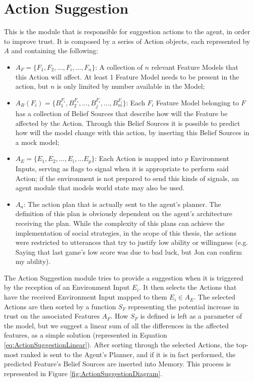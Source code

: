 \section{Action Suggestion}
\label{sec:ActionSuggestion}
This is the module that is responsible for suggestion actions to the agent, in order to improve trust. It is composed by a series of Action objects, each represented by $A$ and containing the following:
\begin{itemize}
    \item $A_F = \{F_1, F_2, ..., F_i, ..., F_n\}$: A collection of $n$ relevant Feature Models that this Action will affect. At least 1 Feature Model needs to be present in the action, but $n$ is only limited by number available in the Model;
    \item $A_B(F_i) = \{B_1^{F_i}, B_2^{F_i}, ..., B_j^{F_i}, ..., B_m^{F_i}\}$: Each $F_i$ Feature Model belonging to $F$ has a collection of Belief Sources that describe how will the Feature be affected by the Action. Through this Belief Sources it is possible to predict how will the model change with this action, by inserting this Belief Sources in a mock model;
    \item $A_E = \{E_1, E_2, ..., E_i, ... E_p\}$: Each Action is mapped into $p$ Environment Inputs, serving as flags to signal when it is appropriate to perform said Action; if the environment is not prepared to send this kinds of signals, an agent module that models world state may also be used.
    \item $A_a$: The action plan that is actually sent to the agent's planner. The definition of this plan is obviously dependent on the agent's architecture receiving the plan. While the complexity of this plans can achieve the implementation of social strategies, in the scope of this thesis, the actions were restricted to utterances that try to justify low ability or willingness (e.g. Saying that last game's low score was due to bad luck, but Jon can confirm my ability).
\end{itemize}

The Action Suggestion module tries to provide a suggestion when it is triggered by the reception of an Environment Input $E_i$. It then selects the Actions that have the received Environment Input mapped to them $E_i \in A_E$. The selected Actions are then sorted by a function $S_F$ representing the potential increase in trust on the associated Features $A_F$. How $S_F$ is defined is left as a parameter of the model, but we suggest a linear sum of all the differences in the affected features, as a simple solution (represented in Equation \ref{eq:ActionSuggestionLinear}). After sorting through the selected Actions, the top-most ranked is sent to the Agent's Planner, and if it is in fact performed, the predicted Feature's Belief Sources are inserted into Memory. This process is represented in Figure \ref{fig:ActionSuggestionDiagram}.

